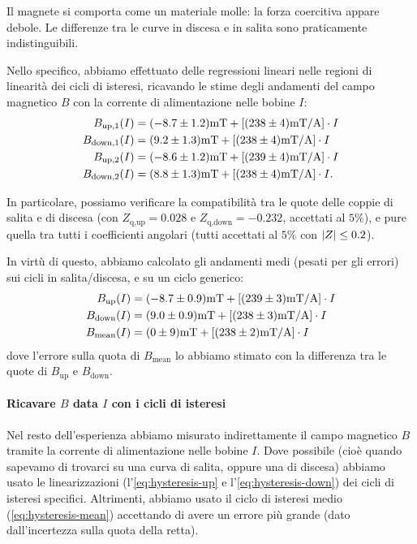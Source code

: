 Il magnete si comporta come un materiale molle: la forza coercitiva appare debole.
Le differenze tra le curve in discesa e in salita sono praticamente indistinguibili. 

Nello specifico, abbiamo effettuato delle regressioni lineari nelle regioni di linearità dei cicli di isteresi, ricavando le stime degli andamenti del campo magnetico $ B $ con la corrente di alimentazione nelle bobine $ I $:
\begin{align}
B_\text{up,1}(I) &= (-8.7 \pm 1.2) \unit{mT} + \qty[(238 \pm 4) \unit{mT / A}] \cdot I \\
B_\text{down,1}(I) &= (9.2 \pm 1.3) \unit{mT} + \qty[(238 \pm 4) \unit{mT / A}] \cdot I \\
B_\text{up,2}(I) &= (-8.6 \pm 1.2) \unit{mT} + \qty[(239 \pm 4) \unit{mT / A}] \cdot I \\
B_\text{down,2}(I) &= (8.8 \pm 1.3) \unit{mT} + \qty[(238 \pm 4) \unit{mT / A}] \cdot I.
\end{align}

In particolare, possiamo verificare la compatibilità tra le quote delle coppie di salita e di discesa (con $ Z_\text{q,up} = 0.028 $ e $ Z_\text{q,down} = -0.232 $, accettati al $ 5 \% $), e pure quella tra tutti i coefficienti angolari (tutti accettati al $ 5 \% $ con $ \abs{Z} \leq 0.2 $). 

In virtù di questo, abbiamo calcolato gli andamenti medi (pesati per gli errori) sui cicli in salita/discesa, e su un ciclo generico:
\begin{align} \label{eq:hysteresis-up}
B_\text{up}(I) &= (-8.7 \pm 0.9) \unit{mT} + \qty[(239 \pm 3) \unit{mT / A}] \cdot I \\ \label{eq:hysteresis-down}
B_\text{down}(I) &= (9.0 \pm 0.9) \unit{mT} + \qty[(238 \pm 3) \unit{mT / A}] \cdot I \\ \label{eq:hysteresis-mean}
B_\text{mean}(I) &= (0 \pm 9) \unit{mT} + \qty[(238 \pm 2) \unit{mT / A}] \cdot I
\end{align}
dove l'errore sulla quota di $ B_\text{mean} $ lo abbiamo stimato con la differenza tra le quote di $ B_\text{up} $ e $ B_\text{down} $.

\paragraph{Ricavare $ B $ data $ I $ con i cicli di isteresi}

Nel resto dell'esperienza abbiamo misurato indirettamente il campo magnetico $ B $ tramite la corrente di alimentazione nelle bobine $ I $.
Dove possibile (cioè quando sapevamo di trovarci su una curva di salita, oppure una di discesa) abbiamo usato le linearizzazioni (l'\cref{eq:hysteresis-up} e l'\cref{eq:hysteresis-down}) dei cicli di isteresi specifici.
Altrimenti, abbiamo usato il ciclo di isteresi medio (\ref{eq:hysteresis-mean}) accettando di avere un errore più grande (dato dall'incertezza sulla quota della retta).

